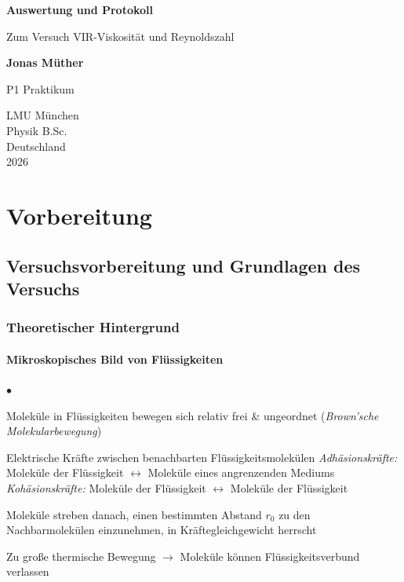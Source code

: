 \documentclass{report}
\begin{document}

\begin{titlepage}
    \begin{center}
        \vspace*{1cm}
            
        \Huge
        \textbf{Auswertung und Protokoll}
            
        \vspace{0.5cm}
        \LARGE
        Zum Versuch VIR-Viskosität und Reynoldszahl
        
        \vspace{1.8cm}

        \textbf{Jonas Müther}
        \vfill
            
        P1 Praktikum\\
       
            
        \vspace{0.8cm}
  

        \vspace{1.8cm}
        \Large
        LMU München \\
        Physik B.Sc.\\
        Deutschland\\
        2026
            
    \end{center}
\end{titlepage}
\tableofcontents

\newpage
\chapter{Vorbereitung}

\section{Versuchsvorbereitung und Grundlagen des Versuchs}
\subsection{Theoretischer Hintergrund}
\subsubsection*{Mikroskopisches Bild von Flüssigkeiten}
\begin{list}{$\bullet$}{}
    \item Moleküle in Flüssigkeiten bewegen sich relativ frei \& ungeordnet (\textit{Brown'sche Molekularbewegung})
    \item Elektrische Kräfte zwischen benachbarten Flüssigkeitsmolekülen
    \subitem \textit{Adhäsionskräfte:} Moleküle der Flüssigkeit $\leftrightarrow$ Moleküle eines angrenzenden Mediums
    \subitem \textit{Kohäsionskräfte:} Moleküle der Flüssigkeit $\leftrightarrow$ Moleküle der Flüssigkeit
    \item Moleküle streben danach, einen bestimmten Abstand $r_0$ zu den Nachbarmolekülen einzunehmen, in Kräftegleichgewicht herrscht
    \item Zu große thermische Bewegung $\rightarrow$ Moleküle können Flüssigkeitsverbund verlassen
\end{list}
\end{document}
